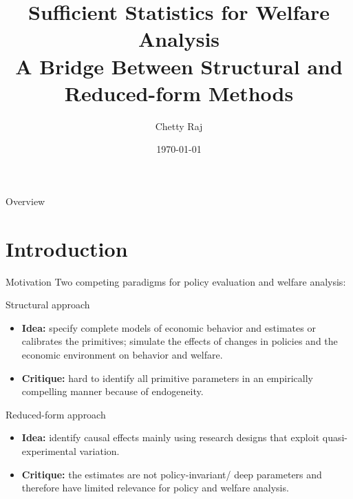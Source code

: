 \documentclass{beamer}
\title[Annu. Rev. Econ, 2009]{Sufficient Statistics for Welfare Analysis \\ {\small A Bridge Between Structural and Reduced-form Methods}}
\author{Chetty Raj}
\institute[]{Presenter: Qinzhu Sun}
\date{\today}
\begin{document}
\begin{frame}
	\titlepage
\end{frame}

\begin{frame}{Overview}
	\tableofcontents
\end{frame}
\section{Introduction}
\begin{frame}[shrink]
	\transfade %
	\tableofcontents[sectionstyle=show/shaded,subsectionstyle=show/shaded/hide]
	\addtocounter{framenumber}{-1}
\end{frame}
\begin{frame}{Motivation}
	Two competing paradigms for policy evaluation and welfare analysis:
	\begin{block}{Structural approach}
		\begin{itemize}
			\item \textbf{Idea:} specify complete models of economic behavior and estimates or calibrates the primitives; simulate the effects of changes in policies and the economic environment on behavior and welfare.
			\item \textbf{Critique:} hard to identify all primitive parameters in an empirically compelling manner because of endogeneity.
		\end{itemize}
	\end{block}
	\begin{block}{Reduced-form approach}
		\begin{itemize}
			\item \textbf{Idea:} identify causal effects mainly using research	designs that exploit quasi-experimental variation.
			\item \textbf{Critique:} the estimates are not policy-invariant/ deep parameters and therefore have limited relevance for policy and welfare analysis.
		\end{itemize}
	\end{block}
\end{frame}
\end{document}
